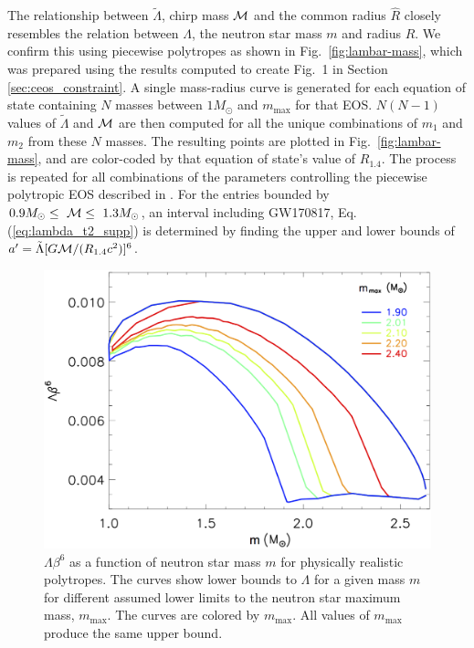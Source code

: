 The relationship between $\tilde\Lambda$, chirp mass ${\cal M}$ and the common radius $\hat R$ closely resembles the relation between $\Lambda$, the neutron star mass $m$ and radius $R$. We confirm this using piecewise polytropes as shown in Fig.~\ref{fig:lambar-mass}, which was prepared using the results computed to create Fig.~1 in Section \ref{sec:ceos_constraint}. A single mass-radius curve is generated for each equation of state containing $N$ masses between $1M_\odot$ and $m_\mathrm{max}$ for that EOS. $N(N-1)$ values of $\tilde\Lambda$ and $\cal{M}$ are then computed for all the unique combinations of $m_1$ and $m_2$ from these $N$ masses. The resulting points are plotted in Fig.~\ref{fig:lambar-mass}, and are color-coded by that equation of state's value of $R_{1.4}$. The process is repeated for all combinations of the parameters controlling the piecewise polytropic EOS described in \cite{Lattimer:2015nhk}. For the entries bounded by $0.9 M_\odot\le~{\cal M} \le~1.3M_\odot$, an interval including GW170817, Eq. (\ref{eq:lambda_t2_supp}) is determined by finding the upper and lower bounds of $a^\prime=\tilde\Lambda[G{\cal M}/(R_{1.4}c^2)]^6$.

\begin{figure}[t]
  \includegraphics[width=\textwidth]{figures/common_eos/lamb6.png}
  \caption{$\Lambda \beta^{6}$ as a function of neutron star mass $m$ for physically realistic polytropes. The curves show lower bounds to $\Lambda$ for a given mass $m$ for different assumed lower limits to the neutron star maximum mass, $m_\mathrm{max}$. The curves are colored by $m_\mathrm{max}$. All values of $m_\mathrm{max}$ produce the same upper bound. \label{fig:lam-beta6}}
\end{figure}

